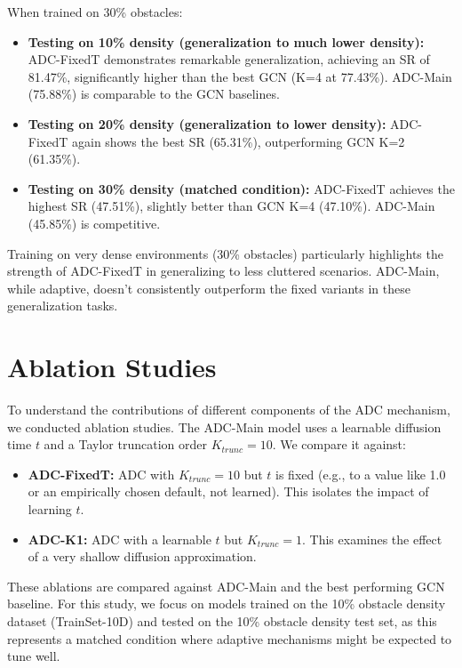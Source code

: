 When trained on 30\% obstacles:
\begin{itemize}
    \item \textbf{Testing on 10\% density (generalization to much lower density):} ADC-FixedT demonstrates remarkable generalization, achieving an SR of 81.47\%, significantly higher than the best GCN (K=4 at 77.43\%). ADC-Main (75.88\%) is comparable to the GCN baselines.
    \item \textbf{Testing on 20\% density (generalization to lower density):} ADC-FixedT again shows the best SR (65.31\%), outperforming GCN K=2 (61.35\%).
    \item \textbf{Testing on 30\% density (matched condition):} ADC-FixedT achieves the highest SR (47.51\%), slightly better than GCN K=4 (47.10\%). ADC-Main (45.85\%) is competitive.
\end{itemize}
Training on very dense environments (30\% obstacles) particularly highlights the strength of ADC-FixedT in generalizing to less cluttered scenarios. ADC-Main, while adaptive, doesn't consistently outperform the fixed variants in these generalization tasks.

\section{Ablation Studies}
\label{sec:ablation_studies_detailed}
To understand the contributions of different components of the ADC mechanism, we conducted ablation studies. The ADC-Main model uses a learnable diffusion time $t$ and a Taylor truncation order $K_{trunc}=10$. We compare it against:
\begin{itemize}
    \item \textbf{ADC-FixedT:} ADC with $K_{trunc}=10$ but $t$ is fixed (e.g., to a value like 1.0 or an empirically chosen default, not learned). This isolates the impact of learning $t$.
    \item \textbf{ADC-K1:} ADC with a learnable $t$ but $K_{trunc}=1$. This examines the effect of a very shallow diffusion approximation.
\end{itemize}
These ablations are compared against ADC-Main and the best performing GCN baseline. For this study, we focus on models trained on the 10\% obstacle density dataset (TrainSet-10D) and tested on the 10\% obstacle density test set, as this represents a matched condition where adaptive mechanisms might be expected to tune well.

